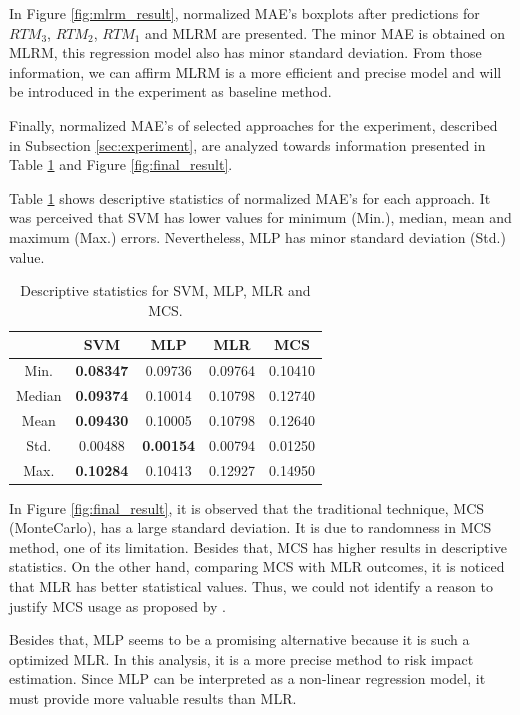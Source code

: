 \documentclass[a4paper,twoside]{article}
\begin{document}
In Figure \ref{fig:mlrm_result}, normalized MAE's boxplots after predictions for $RTM_3$, $RTM_2$, $RTM_1$ and MLRM are presented. The minor MAE is obtained on MLRM, this regression model also has minor standard deviation. From those information, we can affirm MLRM is a more efficient and precise model and will be introduced in the experiment as baseline method.

Finally, normalized MAE's of selected approaches for the experiment, described in Subsection \ref{sec:experiment}, are analyzed towards information presented in Table \ref{tab:final_descriptive} and Figure \ref{fig:final_result}. 

Table \ref{tab:final_descriptive} shows descriptive statistics of normalized MAE's for each approach. It was perceived that SVM has	lower values for minimum (Min.), median, mean and maximum (Max.) errors. Nevertheless, MLP has minor standard deviation (Std.) value.

\begin{table}[h]
\caption{Descriptive statistics for SVM, MLP, MLR and MCS.}\label{tab:final_descriptive} \centering
\begin{tabular}{|c|c|c|c|c|}
  \hline
   & SVM & MLP & MLR & MCS \\
  \hline
  Min. & \textbf{0.08347} & 0.09736 & 0.09764 & 0.10410  \\
  \hline
  Median & \textbf{0.09374} & 0.10014 & 0.10798 & 0.12740 \\
  \hline
  Mean & \textbf{0.09430} & 0.10005 & 0.10798 & 0.12640 \\
  \hline
  Std. & 0.00488 & \textbf{0.00154} & 0.00794 & 0.01250 \\
  \hline
  Max. & \textbf{0.10284} & 0.10413 & 0.12927 & 0.14950 \\
  \hline
\end{tabular}
\end{table}

In Figure \ref{fig:final_result}, it is observed that the traditional technique, MCS (MonteCarlo), has a large standard deviation. It is due to randomness in MCS method, one of its limitation. Besides that, MCS has higher results in descriptive statistics. On the other hand, comparing MCS with MLR outcomes, it is noticed that MLR has better statistical values. Thus, we could not identify a reason to justify MCS usage as proposed by \cite{PMBOK2008}.

Besides that, MLP seems to be a promising alternative because it is such a optimized MLR. In this analysis, it is a more precise method to risk impact estimation. Since MLP can be interpreted as a non-linear regression model, it must provide more valuable results than MLR.
\end{document}
